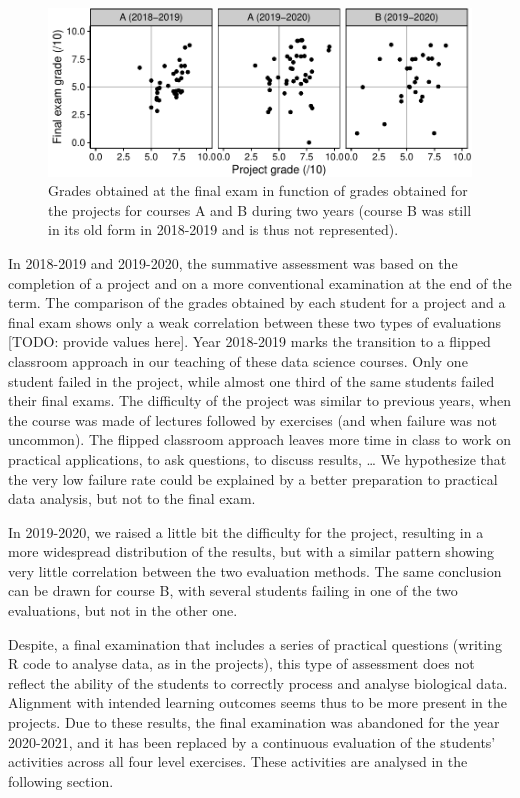 \documentclass{aims}
\theoremstyle{definition}
\begin{document}
\begin{figure}
\includegraphics[width=1\linewidth]{teaching_data_science_files/figure-latex/fig_exams_projects-1} \caption{\label{fig:fig_exams_projects}  Grades obtained at the final exam in function of grades obtained for the projects for courses A and B during two years (course B was still in its old form in 2018-2019 and is thus not represented).}\label{fig:fig_exams_projects}
\end{figure}

In 2018-2019 and 2019-2020, the summative assessment was based on the
completion of a project and on a more conventional examination at the
end of the term. The comparison of the grades obtained by each student
for a project and a final exam shows only a weak correlation between
these two types of evaluations {[}TODO: provide values here{]}. Year
2018-2019 marks the transition to a flipped classroom approach in our
teaching of these data science courses. Only one student failed in the
project, while almost one third of the same students failed their final
exams. The difficulty of the project was similar to previous years, when
the course was made of lectures followed by exercises (and when failure
was not uncommon). The flipped classroom approach leaves more time in
class to work on practical applications, to ask questions, to discuss
results, \ldots{} We hypothesize that the very low failure rate could be
explained by a better preparation to practical data analysis, but not to
the final exam.

In 2019-2020, we raised a little bit the difficulty for the project,
resulting in a more widespread distribution of the results, but with a
similar pattern showing very little correlation between the two
evaluation methods. The same conclusion can be drawn for course B, with
several students failing in one of the two evaluations, but not in the
other one.

Despite, a final examination that includes a series of practical
questions (writing R code to analyse data, as in the projects), this
type of assessment does not reflect the ability of the students to
correctly process and analyse biological data. Alignment with intended
learning outcomes seems thus to be more present in the projects. Due to
these results, the final examination was abandoned for the year
2020-2021, and it has been replaced by a continuous evaluation of the
students' activities across all four level exercises. These activities
are analysed in the following section.
\end{document}

